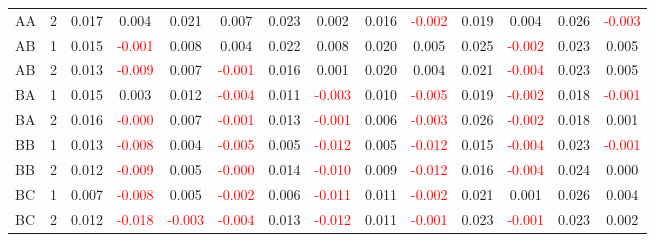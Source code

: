 \begin{table}[!htb]
{\begin{tabular}{llcccccccccccc}
AA & 2 & 0.017 & 0.004 & 0.021 & 0.007 & 0.023 & 0.002 & 0.016 & \textcolor{red}{-0.002} & 0.019 & 0.004 & 0.026 & \textcolor{red}{-0.003}\\
AB & 1 & 0.015 & \textcolor{red}{-0.001} & 0.008 & 0.004 & 0.022 & 0.008 & 0.020 & 0.005 & 0.025 & \textcolor{red}{-0.002} & 0.023 & 0.005\\
AB & 2 & 0.013 & \textcolor{red}{-0.009} & 0.007 & \textcolor{red}{-0.001} & 0.016 & 0.001 & 0.020 & 0.004 & 0.021 & \textcolor{red}{-0.004} & 0.023 & 0.005\\
BA & 1 & 0.015 & 0.003 & 0.012 & \textcolor{red}{-0.004} & 0.011 & \textcolor{red}{-0.003} & 0.010 & \textcolor{red}{-0.005} & 0.019 & \textcolor{red}{-0.002} & 0.018 & \textcolor{red}{-0.001}\\
BA & 2 & 0.016 & \textcolor{red}{-0.000} & 0.007 & \textcolor{red}{-0.001} & 0.013 & \textcolor{red}{-0.001} & 0.006 & \textcolor{red}{-0.003} & 0.026 & \textcolor{red}{-0.002} & 0.018 & 0.001\\
BB & 1 & 0.013 & \textcolor{red}{-0.008} & 0.004 & \textcolor{red}{-0.005} & 0.005 & \textcolor{red}{-0.012} & 0.005 & \textcolor{red}{-0.012} & 0.015 & \textcolor{red}{-0.004} & 0.023 & \textcolor{red}{-0.001}\\
BB & 2 & 0.012 & \textcolor{red}{-0.009} & 0.005 & \textcolor{red}{-0.000} & 0.014 & \textcolor{red}{-0.010} & 0.009 & \textcolor{red}{-0.012} & 0.016 & \textcolor{red}{-0.004} & 0.024 & 0.000\\
BC & 1 & 0.007 & \textcolor{red}{-0.008} & 0.005 & \textcolor{red}{-0.002} & 0.006 & \textcolor{red}{-0.011} & 0.011 & \textcolor{red}{-0.002} & 0.021 & 0.001 & 0.026 & 0.004\\
BC & 2 & 0.012 & \textcolor{red}{-0.018} & \textcolor{red}{-0.003} & \textcolor{red}{-0.004} & 0.013 & \textcolor{red}{-0.012} & 0.011 & \textcolor{red}{-0.001} & 0.023 & \textcolor{red}{-0.001} & 0.023 & 0.002\\
\hline
    \end{tabular}%
    }
\end{table}

